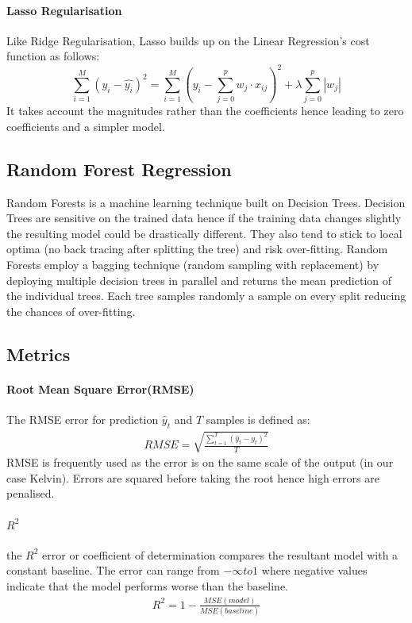 \documentclass{article}
\begin{document}
\paragraph{Lasso Regularisation} Like Ridge Regularisation, Lasso builds up on the Linear Regression's cost function as follows:
\begin{equation}
    \sum_{i=1}^M (y_i-\hat{y_i})^2 = \sum^M_{i=1}\left(y_i-\sum^p_{j=0}w_j \cdot x_{ij}\right)^2 + \lambda\sum^p_{j=0}|w_j|
\end{equation}{}
It takes account the magnitudes rather than the coefficients hence leading to zero coefficients and a simpler model.
\subsection{Random Forest Regression} Random Forests is a machine learning technique built on Decision Trees. Decision Trees are sensitive on the trained data hence if the training data changes slightly the resulting model could be drastically different. They also tend to stick to local optima (no back tracing after splitting the tree) and risk over-fitting. Random Forests employ a bagging technique (random sampling with replacement) by deploying multiple decision trees in parallel and returns the mean prediction of the individual trees. Each tree samples randomly a sample on every split reducing the chances of over-fitting.
\subsection{Metrics}
\paragraph{Root Mean Square Error(RMSE)} The RMSE error for prediction \(\hat{y}_t\) and \(T\) samples is defined as:
\begin{align}
    RMSE = \sqrt{\frac{\sum^T_{t=1}(\hat{y}_t-y_t)^2}{T}}
\end{align}{} RMSE is frequently used as the error is on the same scale of the output (in our case Kelvin). Errors are squared before taking the root hence high errors are penalised.
\paragraph{\(R^2\)} the \(R^2\) error or coefficient of determination compares the resultant model with a constant baseline. The error can range from \(-\infty to 1\) where negative values indicate that the model performs worse than the baseline.
\begin{align}
    R^2 = 1- \frac{MSE(model)}{MSE(baseline)}
\end{align}{}
\end{document}
